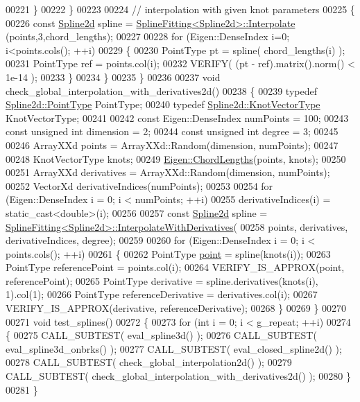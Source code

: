 \begin{DoxyCode}
00221     \}
00222   \}
00223 
00224   \textcolor{comment}{// interpolation with given knot parameters}
00225   \{
00226     \textcolor{keyword}{const} \hyperlink{namespace_eigen_aad3d357fe2fef560e7d8e592fb215fbf}{Spline2d} spline = \hyperlink{group___splines___module_adc80b6f0dd0dbbea28130fb254626874}{SplineFitting<Spline2d>::Interpolate}
      (points,3,chord\_lengths);  
00227 
00228     \textcolor{keywordflow}{for} (Eigen::DenseIndex i=0; i<points.cols(); ++i)
00229     \{
00230       PointType pt = spline( chord\_lengths(i) );
00231       PointType ref = points.col(i);
00232       VERIFY( (pt - ref).matrix().norm() < 1e-14 );
00233     \}
00234   \}
00235 \}
00236 
00237 \textcolor{keywordtype}{void} check\_global\_interpolation\_with\_derivatives2d()
00238 \{
00239   \textcolor{keyword}{typedef} \hyperlink{group___splines___module_a9ade8a2f81dae6eedb8845cb080672bd}{Spline2d::PointType} PointType;
00240   \textcolor{keyword}{typedef} \hyperlink{group___splines___module_a066f7a8b120316c9068b559f0790e9ec}{Spline2d::KnotVectorType} KnotVectorType;
00241 
00242   \textcolor{keyword}{const} Eigen::DenseIndex numPoints = 100;
00243   \textcolor{keyword}{const} \textcolor{keywordtype}{unsigned} \textcolor{keywordtype}{int} dimension = 2;
00244   \textcolor{keyword}{const} \textcolor{keywordtype}{unsigned} \textcolor{keywordtype}{int} degree = 3;
00245 
00246   ArrayXXd points = ArrayXXd::Random(dimension, numPoints);
00247 
00248   KnotVectorType knots;
00249   \hyperlink{group___splines___module_ga1b4cbde5d98411405871accf877552d2}{Eigen::ChordLengths}(points, knots);
00250 
00251   ArrayXXd derivatives = ArrayXXd::Random(dimension, numPoints);
00252   VectorXd derivativeIndices(numPoints);
00253 
00254   \textcolor{keywordflow}{for} (Eigen::DenseIndex i = 0; i < numPoints; ++i)
00255       derivativeIndices(i) = \textcolor{keyword}{static\_cast<}\textcolor{keywordtype}{double}\textcolor{keyword}{>}(i);
00256 
00257   \textcolor{keyword}{const} \hyperlink{namespace_eigen_aad3d357fe2fef560e7d8e592fb215fbf}{Spline2d} spline = 
      \hyperlink{group___splines___module_a7bd937fdcfa168dbdc27932886a4da9f}{SplineFitting<Spline2d>::InterpolateWithDerivatives}(
00258     points, derivatives, derivativeIndices, degree);  
00259     
00260   \textcolor{keywordflow}{for} (Eigen::DenseIndex i = 0; i < points.cols(); ++i)
00261   \{
00262     PointType \hyperlink{structpoint}{point} = spline(knots(i));
00263     PointType referencePoint = points.col(i);
00264     VERIFY\_IS\_APPROX(point, referencePoint);
00265     PointType derivative = spline.derivatives(knots(i), 1).col(1);
00266     PointType referenceDerivative = derivatives.col(i);
00267     VERIFY\_IS\_APPROX(derivative, referenceDerivative);
00268   \}
00269 \}
00270 
00271 \textcolor{keywordtype}{void} test\_splines()
00272 \{
00273   \textcolor{keywordflow}{for} (\textcolor{keywordtype}{int} i = 0; i < g\_repeat; ++i)
00274   \{
00275     CALL\_SUBTEST( eval\_spline3d() );
00276     CALL\_SUBTEST( eval\_spline3d\_onbrks() );
00277     CALL\_SUBTEST( eval\_closed\_spline2d() );
00278     CALL\_SUBTEST( check\_global\_interpolation2d() );
00279     CALL\_SUBTEST( check\_global\_interpolation\_with\_derivatives2d() );
00280   \}
00281 \}
\end{DoxyCode}
